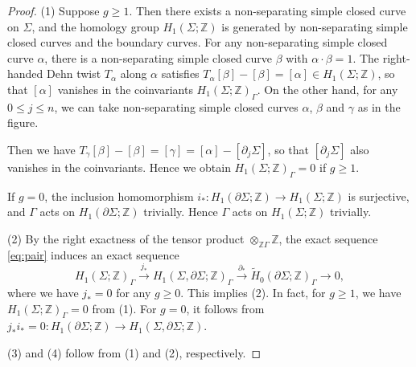 \documentclass[a4paper,12pt, twoside]{amsart}
\theoremstyle{definition}
\theoremstyle{remark}
\numberwithin{equation}{section}
\newcommand\bZ{{\mathbb{Z}}}
\newcommand\pa{\partial}
\begin{document}
\begin{proof} (1) Suppose $g \geq 1$. Then there exists a non-separating simple closed curve on $\Sigma$, and the homology group $H_1(\Sigma; \bZ)$ is generated by non-separating simple closed curves and the boundary curves.
For any  non-separating simple closed curve $\alpha$, there is a  non-separating simple closed curve $\beta$ with $\alpha\cdot\beta = 1$. The right-handed Dehn twist $T_\alpha$ along $\alpha$ satisfies $T_\alpha[\beta] - [\beta] = [\alpha] \in H_1(\Sigma; \bZ)$, so that $[\alpha]$ vanishes in the coinvariants $H_1(\Sigma; \bZ)_\Gamma$. On the other hand, for any $0 \leq j \leq n$, we can take non-separating simple closed curves $\alpha$, $\beta$ and $\gamma$ as in the figure.
\begin{figure}[h]
\begin{center}
\end{center}
\label{fig:abc}
\end{figure}
Then we have $T_\gamma[\beta] - [\beta] = [\gamma] = [\alpha] - [\pa_j\Sigma]$, so that $[\pa_j\Sigma]$ also vanishes in the coinvariants. Hence we obtain $H_1(\Sigma; \bZ)_\Gamma = 0$ if $g \geq 1$.\par
If $g = 0$, the inclusion homomorphism $i_*: H_1(\pa\Sigma; \bZ) \to H_1(\Sigma; \bZ)$ is surjective, and $\Gamma$ acts on $H_1(\pa\Sigma; \bZ)$ trivially. Hence $\Gamma$ acts on $H_1(\Sigma; \bZ)$ trivially.\par
(2) By the right exactness of the tensor product $\otimes_{\bZ\Gamma}\bZ$,
the exact sequence \eqref{eq:pair} induces an exact sequence
$$
H_1(\Sigma; \bZ)_\Gamma \overset{j_*}\to H_1(\Sigma, \pa \Sigma; \bZ)_\Gamma \overset{\pa_*}\to \tilde H_0(\pa\Sigma; \bZ)_\Gamma \to 0,
$$
where we have $j_* = 0$ for any $g \geq 0$. This implies (2).
In fact, for $g \geq 1$, we have $H_1(\Sigma; \bZ)_\Gamma = 0$  from (1). For $g =0$, it follows from $j_*i_* = 0: H_1(\pa\Sigma; \bZ) \to H_1(\Sigma, \pa \Sigma; \bZ)$.  \par
(3) and (4) follow from (1) and (2), respectively.
\end{proof}
\end{document}
